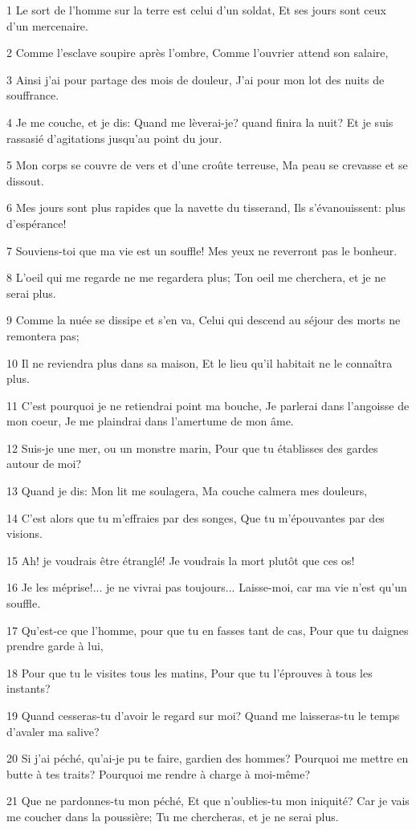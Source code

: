 \par 1 Le sort de l'homme sur la terre est celui d'un soldat, Et ses jours sont ceux d'un mercenaire.
\par 2 Comme l'esclave soupire après l'ombre, Comme l'ouvrier attend son salaire,
\par 3 Ainsi j'ai pour partage des mois de douleur, J'ai pour mon lot des nuits de souffrance.
\par 4 Je me couche, et je dis: Quand me lèverai-je? quand finira la nuit? Et je suis rassasié d'agitations jusqu'au point du jour.
\par 5 Mon corps se couvre de vers et d'une croûte terreuse, Ma peau se crevasse et se dissout.
\par 6 Mes jours sont plus rapides que la navette du tisserand, Ils s'évanouissent: plus d'espérance!
\par 7 Souviens-toi que ma vie est un souffle! Mes yeux ne reverront pas le bonheur.
\par 8 L'oeil qui me regarde ne me regardera plus; Ton oeil me cherchera, et je ne serai plus.
\par 9 Comme la nuée se dissipe et s'en va, Celui qui descend au séjour des morts ne remontera pas;
\par 10 Il ne reviendra plus dans sa maison, Et le lieu qu'il habitait ne le connaîtra plus.
\par 11 C'est pourquoi je ne retiendrai point ma bouche, Je parlerai dans l'angoisse de mon coeur, Je me plaindrai dans l'amertume de mon âme.
\par 12 Suis-je une mer, ou un monstre marin, Pour que tu établisses des gardes autour de moi?
\par 13 Quand je dis: Mon lit me soulagera, Ma couche calmera mes douleurs,
\par 14 C'est alors que tu m'effraies par des songes, Que tu m'épouvantes par des visions.
\par 15 Ah! je voudrais être étranglé! Je voudrais la mort plutôt que ces os!
\par 16 Je les méprise!... je ne vivrai pas toujours... Laisse-moi, car ma vie n'est qu'un souffle.
\par 17 Qu'est-ce que l'homme, pour que tu en fasses tant de cas, Pour que tu daignes prendre garde à lui,
\par 18 Pour que tu le visites tous les matins, Pour que tu l'éprouves à tous les instants?
\par 19 Quand cesseras-tu d'avoir le regard sur moi? Quand me laisseras-tu le temps d'avaler ma salive?
\par 20 Si j'ai péché, qu'ai-je pu te faire, gardien des hommes? Pourquoi me mettre en butte à tes traits? Pourquoi me rendre à charge à moi-même?
\par 21 Que ne pardonnes-tu mon péché, Et que n'oublies-tu mon iniquité? Car je vais me coucher dans la poussière; Tu me chercheras, et je ne serai plus.

